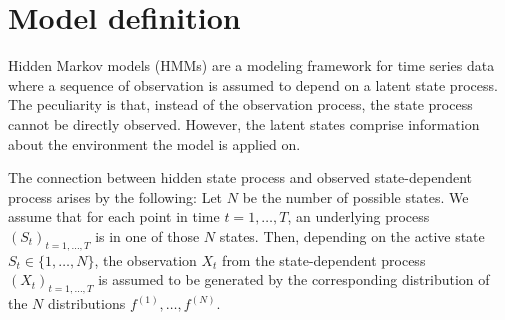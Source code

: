 \documentclass[article]{jss}
\begin{document}


\section{Model definition} \label{sec:model_definition} %

Hidden Markov models (HMMs) are a modeling framework for time series data where a sequence of observation is assumed to depend on a latent state process. The peculiarity is that, instead of the observation process, the state process cannot be directly observed. However, the latent states comprise information about the environment the model is applied on. 

The connection between hidden state process and observed state-dependent process arises by the following: Let $N$ be the number of possible states. We assume that for each point in time $t = 1, \ldots, T$, an underlying process $(S_t)_{t = 1, \ldots, T}$ is in one of those $N$ states. Then, depending on the active state $S_t \in \{ 1, \ldots, N \}$, the observation $X_t$ from the state-dependent process $(X_t)_{t = 1, \ldots, T}$ is assumed to be generated by the corresponding distribution of the $N$ distributions $f^{(1)},\dots,f^{(N)}.$
\end{document}
